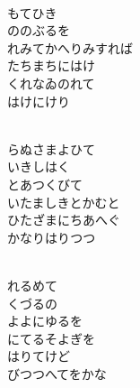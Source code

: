 \documentclass[10pt,b5j]{tarticle} %
\begin{document}
\begin{enumerate}
\begin{minipage}[c]{\blocksize}
        \vspace{\linespace}
        \item~\\
        もてひき\\
        ののぶるを\\
        れみてかへりみすれば\\
        たちまちにはけ\\
        くれなゐのれて\\
        はけにけり
        
    \end{minipage}
    \begin{minipage}[c]{\blocksize}
        
        \vspace{\linespace}
        \item~\\
        らぬさまよひて\\
        いきしはく\\
        とあつくびて\\
        いたましきとかむと\\
        ひたざまにちあへぐ\\
        かなりはりつつ
        
        \vspace{\linespace}
        \item~\\
        れるめて\\
        くづるの\\
        よよにゆるを\\
        にてるそよぎを\\
        はりてけど\\
        びつつへてをかな
    
    \end{minipage}
\end{enumerate} %
\end{document}
